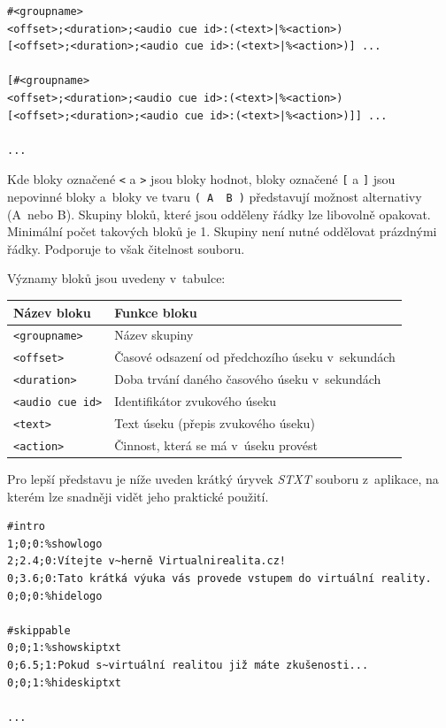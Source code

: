 \begin{verbatim}
#<groupname>
<offset>;<duration>;<audio cue id>:(<text>|%<action>)
[<offset>;<duration>;<audio cue id>:(<text>|%<action>)] ...

[#<groupname>
<offset>;<duration>;<audio cue id>:(<text>|%<action>)
[<offset>;<duration>;<audio cue id>:(<text>|%<action>)]] ...

...
\end{verbatim}

Kde bloky označené \texttt{\textless{}} a \texttt{\textgreater{}} jsou
bloky hodnot, bloky označené \texttt{{[}} a \texttt{{]}} jsou nepovinné
bloky a~bloky ve tvaru \texttt{(\ A\ \textbar{}\ B\ )} představují
možnost alternativy (A~nebo B). Skupiny bloků, které jsou odděleny řádky
lze libovolně opakovat. Minimální počet takových bloků je 1. Skupiny
není nutné oddělovat prázdnými řádky. Podporuje to však čitelnost souboru.

\newpage

Významy bloků jsou uvedeny v~tabulce:


\extrarowsep=4pt\begin{longtabu}{XX}
\toprule
Název bloku & Funkce bloku\tabularnewline
\midrule
\endhead
\texttt{\textless{}groupname\textgreater{}} & Název
skupiny\tabularnewline
\texttt{\textless{}offset\textgreater{}} & Časové odsazení od
předchozího úseku v~sekundách\tabularnewline
\texttt{\textless{}duration\textgreater{}} & Doba trvání daného časového
úseku v~sekundách\tabularnewline
\texttt{\textless{}audio\ cue\ id\textgreater{}} & Identifikátor
zvukového úseku\tabularnewline
\texttt{\textless{}text\textgreater{}} & Text úseku (přepis zvukového
úseku)\tabularnewline
\texttt{\textless{}action\textgreater{}} & Činnost, která se má v~úseku
provést\tabularnewline
\bottomrule
\end{longtabu}

Pro lepší představu je níže uveden krátký úryvek \emph{STXT} souboru
z~aplikace, na kterém lze snadněji vidět jeho praktické použití.

\begin{verbatim}
#intro
1;0;0:%showlogo
2;2.4;0:Vítejte v~herně Virtualnirealita.cz!
0;3.6;0:Tato krátká výuka vás provede vstupem do virtuální reality.
0;0;0:%hidelogo

#skippable
0;0;1:%showskiptxt
0;6.5;1:Pokud s~virtuální realitou již máte zkušenosti...
0;0;1:%hideskiptxt

...
\end{verbatim}

